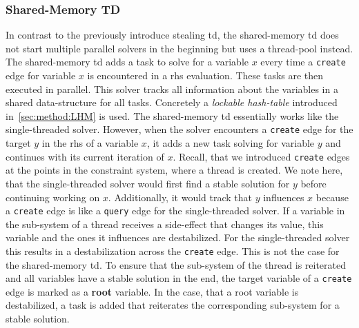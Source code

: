     \subsubsection{Shared-Memory TD}
    \label{sec:method:td_parallel:sharedMem}
    In contrast to the previously introduce stealing \ac{td}, the shared-memory \ac{td} does not start multiple parallel solvers in the beginning but uses a thread-pool instead. The shared-memory \ac{td} adds a task to solve for a variable $x$ every time a \texttt{create} edge for variable $x$ is encountered in a \ac{rhs} evaluation. These tasks are then executed in parallel.
    This solver tracks all information about the variables in a shared data-structure for all tasks. Concretely a \textit{lockable hash-table} introduced in~\autoref{sec:method:LHM} is used.
    The shared-memory \ac{td} essentially works like the single-threaded solver. However, when the solver encounters a \texttt{create} edge for the target $y$ in the \ac{rhs} of a variable $x$, it adds a new task solving for variable $y$ and continues with its current iteration of $x$. Recall, that we introduced \texttt{create} edges at the points in the constraint system, where a thread is created. We note here, that the single-threaded solver would first find a stable solution for $y$ before continuing working on $x$. Additionally, it would track that $y$ influences $x$ because a \texttt{create} edge is like a \texttt{query} edge for the single-threaded solver. If a variable in the sub-system of a thread receives a side-effect that changes its value, this variable and the ones it influences are destabilized. For the single-threaded solver this results in a destabilization across the \texttt{create} edge. This is not the case for the shared-memory \ac{td}. To ensure that the sub-system of the thread is reiterated and all variables have a stable solution in the end, the target variable of a \texttt{create} edge is marked as a \textbf{root} variable. In the case, that a root variable is destabilized, a task is added that reiterates the corresponding sub-system for a stable solution.

